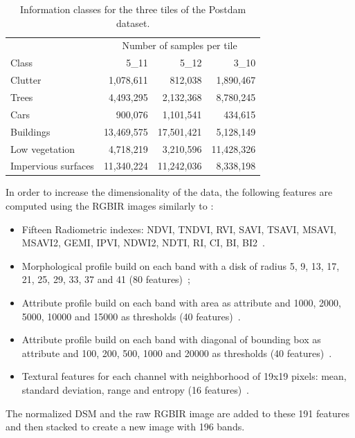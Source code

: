 \documentclass[journal,peerreview,onecolumn]{IEEEtran}
\begin{document}
    \begin{table}[!t]
        \centering
        \caption{Information classes for the three tiles of the Postdam dataset.\label{tab:potsdam}}
        \begin{tabular}[b]{lrrr}\toprule
          & \multicolumn{3}{c}{Number of samples per tile}\\
            \cmidrule{2-4}
            Class &   5\_11  &   5\_12  & 3\_10 \\
          \midrule
          Clutter             & 1,078,611  & 812,038    & 1,890,467 \\
          Trees               & 4,493,295  & 2,132,368  & 8,780,245 \\
          Cars                & 900,076    & 1,101,541  & 434,615 \\
          Buildings           & 13,469,575 & 17,501,421 & 5,128,149 \\
          Low vegetation      & 4,718,219  & 3,210,596  & 11,428,326 \\
          Impervious surfaces & 11,340,224 & 11,242,036 & 8,338,198 \\
          \bottomrule
        \end{tabular}
    \end{table}

    In order to increase the dimensionality of the data, the following features are computed using the RGBIR images similarly to \cite{tuia2015multiclass}:
    \begin{itemize}
        \item Fifteen Radiometric indexes: NDVI, TNDVI, RVI, SAVI, TSAVI, MSAVI, MSAVI2, GEMI, IPVI, NDWI2, NDTI, RI, CI, BI, BI2~\cite{otb}.
        \item Morphological profile build on each band with a disk of radius 5, 9, 13, 17, 21, 25, 29, 33, 37 and 41 (80 features)~\cite{fauvel2013advances};
        \item Attribute profile build on each band with area as attribute and 1000, 2000, 5000, 10000 and 15000 as thresholds (40 features)~\cite{dalla2010morphological}.
        \item Attribute profile build on each band with diagonal of bounding box as attribute and 100, 200, 500, 1000 and 20000 as thresholds (40 features)~\cite{dalla2010morphological}.
        \item Textural features for  each channel with neighborhood of
          19x19 pixels:  mean, standard  deviation, range  and entropy
          (16 features)~\cite{otb}.
    \end{itemize}
    The normalized DSM and the raw  RGBIR image are added to these 191
    features and  then stacked to  create a  new image  with 196
    bands. %
\end{document}
